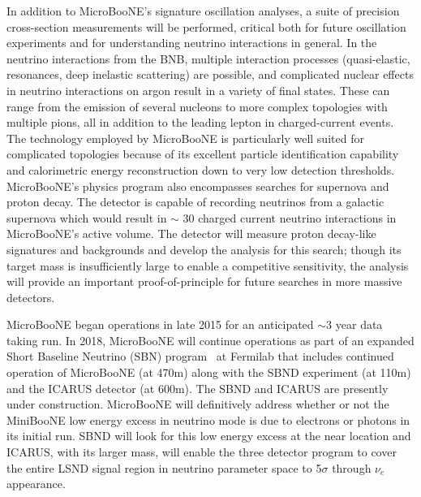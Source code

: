 
In addition to MicroBooNE's signature oscillation analyses, a suite of precision cross-section measurements will be performed, critical both for future \lartpc oscillation experiments and for understanding neutrino interactions in general.   In the neutrino interactions from the BNB, multiple interaction processes (quasi-elastic, resonances, deep inelastic scattering) are possible, and complicated nuclear effects in neutrino interactions on argon result in a variety of final states. These can range from the emission of several nucleons to more complex topologies with multiple pions, all in addition to the leading lepton in charged-current events. The \lartpc technology employed by MicroBooNE is particularly well suited for complicated topologies because of its excellent particle identification capability and calorimetric energy reconstruction down to very low detection thresholds. MicroBooNE's physics program also encompasses searches for supernova and proton decay.  The detector is capable of recording neutrinos from a galactic supernova which would result in $\sim$ 30 charged current neutrino interactions in MicroBooNE's active volume.   The detector will measure proton decay-like signatures and backgrounds and develop the analysis for this search; though its target mass is insufficiently large to enable a competitive sensitivity, the analysis will provide an important proof-of-principle for future searches in more massive detectors.  


MicroBooNE began operations in late 2015 for an anticipated $\sim$3 year data taking run.   In 2018, MicroBooNE will continue operations as part of an expanded Short Baseline Neutrino (SBN) program~\cite{Adams:2013-lar1nd} at Fermilab that includes continued operation of MicroBooNE (at 470m) along with the SBND experiment (at 110m)  and the ICARUS detector (at 600m).  The SBND and ICARUS are presently under construction.  MicroBooNE will definitively address whether or not the MiniBooNE low energy excess in neutrino mode is due to electrons or photons in its initial run.  SBND will look for this low energy excess at the near location and ICARUS, with its larger mass, will enable the three detector program to cover the entire LSND signal region in neutrino parameter space to 5$\sigma$ through $\nu_e$ appearance.


